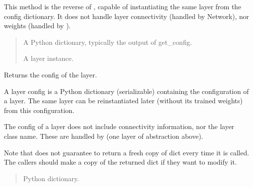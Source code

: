 \documentclass[letterpaper,10pt,english]{sphinxmanual}
\begin{document}
\begin{fulllineitems}
\begin{fulllineitems}
\sphinxAtStartPar
This method is the reverse of ,
capable of instantiating the same layer from the config
dictionary. It does not handle layer connectivity
(handled by Network), nor weights (handled by ).
\begin{quote}\begin{description}
\sphinxAtStartPar
{} \textendash{} A Python dictionary, typically the
output of get\_config.

\sphinxAtStartPar
A layer instance.

\end{description}\end{quote}

\end{fulllineitems}


\begin{fulllineitems}
\label{\detokenize{beyondml.tflow.layers:beyondml.tflow.layers.MultitaskNormalization.MultitaskNormalization.get_config}}
\pysigstartsignatures
{}
\pysigstopsignatures
\sphinxAtStartPar
Returns the config of the layer.

\sphinxAtStartPar
A layer config is a Python dictionary (serializable)
containing the configuration of a layer.
The same layer can be reinstantiated later
(without its trained weights) from this configuration.

\sphinxAtStartPar
The config of a layer does not include connectivity
information, nor the layer class name. These are handled
by  (one layer of abstraction above).

\sphinxAtStartPar
Note that  does not guarantee to return a fresh copy of
dict every time it is called. The callers should make a copy of the
returned dict if they want to modify it.
\begin{quote}\begin{description}
\sphinxAtStartPar
Python dictionary.

\end{description}\end{quote}

\end{fulllineitems}


\end{fulllineitems}
\end{document}
